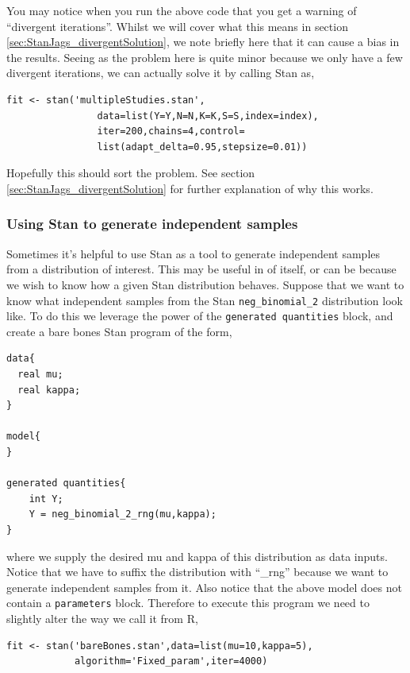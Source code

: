 \documentclass[11pt,fullpage]{book}
\begin{document}
You may notice when you run the above code that you get a warning of ``divergent iterations''. Whilst we will cover what this means in section \ref{sec:StanJags_divergentSolution}, we note briefly here that it can cause a bias in the results. Seeing as the problem here is quite minor because we only have a few divergent iterations, we can actually solve it by calling Stan as,

\begin{verbatim}
fit <- stan('multipleStudies.stan', 
                data=list(Y=Y,N=N,K=K,S=S,index=index),
                iter=200,chains=4,control=
                list(adapt_delta=0.95,stepsize=0.01))
\end{verbatim}

Hopefully this should sort the problem. See section \ref{sec:StanJags_divergentSolution} for further explanation of why this works.

\subsubsection{Using Stan to generate independent samples}\label{sec:StanJags_independent}
Sometimes it's helpful to use Stan as a tool to generate independent samples from a distribution of interest. This may be useful in of itself, or can be because we wish to know how a given Stan distribution behaves. Suppose that we want to know what independent samples from the Stan \texttt{neg_binomial_2} distribution look like. To do this we leverage the power of the \texttt{generated quantities} block, and create a bare bones Stan program of the form,

\begin{verbatim}
data{
  real mu;
  real kappa;
}

model{
}

generated quantities{
    int Y;
    Y = neg_binomial_2_rng(mu,kappa);
}
\end{verbatim}
where we supply the desired mu and kappa of this distribution as data inputs. Notice that we have to suffix the distribution with ``\_rng'' because we want to generate independent samples from it. Also notice that the above model does not contain a \texttt{parameters} block. Therefore to execute this program we need to slightly alter the way we call it from R,

\begin{verbatim}
fit <- stan('bareBones.stan',data=list(mu=10,kappa=5),
            algorithm='Fixed_param',iter=4000)
\end{verbatim}
\end{document}
